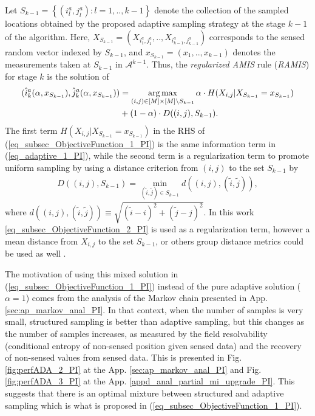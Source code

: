 Let  $S_{k-1} = \left\{(i^a_l,j^a_l): l=1,..,k-1\right\}$ denote the collection of the sampled locations obtained by the proposed adaptive sampling strategy at the stage $k-1$ of the algorithm. Here, $X_{S_{k-1}} = (X_{i^a_1,j^a_1},.., X_{i^a_{k-1},j^a_{k-1}})$ corresponds to the sensed random vector indexed by $S_{k-1}$, and $x_{S_{k-1}} = ( x_1,.., x_{k-1})$ denotes the measurements taken at $S_{k-1}$ in $\mathcal{A}^{k-1}$. Thus, the \emph{regularized AMIS} rule (\emph{RAMIS}) for stage $k$ is
the solution of
\begin{align}\label{eq_subsec_ObjectiveFunction_1_PI}
	(\hat{i}^a_k(\alpha, x_{S_{k-1}}), \hat{j}^a_k(\alpha, x_{S_{k-1}})) &= \operatorname*{arg\,max}_{(i,j)\in [M]\times [M] \setminus S_{k-1}} \alpha \cdot H(X_{i,j}| X_{S_{k-1}} = x_{S_{k-1}} ) \nonumber\\   
	&+ (1 - \alpha) \cdot D(({i,j}),{S_{k-1}}). 
\end{align}
The first term $H(X_{i,j}| X_{S_{k-1}} = x_{S_{k-1}} )$ in the RHS of (\ref{eq_subsec_ObjectiveFunction_1_PI}) is the same information term in (\ref{eq_adaptive_1_PI}), while the second term is a
regularization term to promote uniform sampling by using a distance criterion from $(i,j)$ to  the set $S_{k-1}$ by
\begin{align}\label{eq_subsec_ObjectiveFunction_2_PI}
	D(({i,j}),{S_{k-1}}) = \min_{({\tilde{i},\tilde{j}}) \in S_{k-1}}  d(({i,j}), ({\tilde{i},\tilde{j}})),
\end{align}
where $d(({i,j}), ({\tilde{i},\tilde{j}})) \equiv \sqrt{(\tilde{i}-i)^2+ (\tilde{j}-j)^2}$.
{In this work \eqref{eq_subsec_ObjectiveFunction_2_PI} is used as a regularization term, however a mean distance from $X_{i,j}$ to  the set $S_{k-1}$,  or others group distance metrics could be used as well \citep{Scheidt2009_a}.}

The motivation of using this mixed solution in (\ref{eq_subsec_ObjectiveFunction_1_PI}) instead of the pure adaptive solution ($\alpha=1$) comes from the analysis of the Markov chain presented in App. \ref{sec:ap_markov_anal_PI}. In that context, when the number of samples is very small, structured sampling is better than adaptive sampling, but this changes as the number of samples increases, as measured by the field resolvability (conditional entropy of non-sensed position given sensed data) and the recovery of non-sensed values from sensed data. This is presented in  Fig.\ref{fig:perfADA_2_PI} at the App. \ref{sec:ap_markov_anal_PI} and  Fig. \ref{fig:perfADA_3_PI} at the App. \ref{appd_anal_partial_mi_upgrade_PI}.  This suggests that there is an optimal mixture between structured and adaptive sampling which is what is proposed in (\ref{eq_subsec_ObjectiveFunction_1_PI}).


